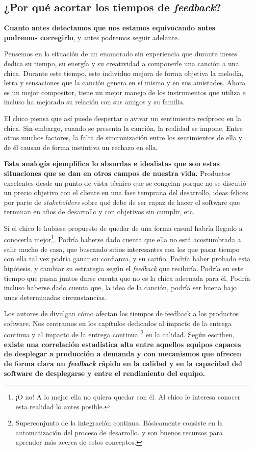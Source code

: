 \subsection{¿Por qué acortar los tiempos de \textit{feedback}?}

\textbf{Cuanto antes detectamos que nos estamos equivocando
antes podremos corregirlo}, y antes podremos seguir adelante.

Pensemos en la situación de un enamorado sin experiencia que durante meses dedica su
tiempo, su energía y su creatividad a componerle una canción a una chica.
Durante este tiempo, este individuo mejora de forma objetiva la
melodía, letra y sensaciones que la canción genera en sí mismo
y en sus amistades. Ahora es un mejor compositor, tiene un mejor manejo
de los instrumentos que utiliza e incluso ha mejorado su
relación con sus amigos y su familia.

El chico piensa que así puede despertar o avivar un sentimiento recíproco
en la chica. Sin embargo, cuando se presenta la canción,
la realidad se impone. Entre otros muchos factores,
la falta de sincronización entre los sentimientos de ella y de él causan
de forma instintiva un rechazo en ella.

\textbf{Esta analogía ejemplifica lo absurdas e idealistas
que son estas situaciones que se dan en otros campos de nuestra vida.}
Productos excelentes desde un punto de vista técnico que se
congelan porque no se discutió un precio objetivo con
el cliente en una fase temprana del desarrollo, ideas felices
por parte de \textit{stakeholders} sobre qué debe de
ser capaz de hacer el software que terminan en años de desarrollo
y con objetivos sin cumplir, etc.

Si el chico le hubiese propuesto de quedar de una forma casual
habría llegado a conocerla mejor\footnote{¡O no! A lo mejor ella no
quiera quedar con él. Al chico le interesa
conocer esta realidad lo antes posible.}. Podría haberse dado cuenta que
ella no está acostumbrada a salir mucho de casa, que buscando sitios
interesantes con los que pasar tiempo con ella tal vez podría ganar su
confianza, y su cariño. Podría haber probado esta hipótesis, y cambiar
su estrategia según el \textit{feedback} que recibiría. Podría en este tiempo que
pasan juntos darse cuenta que no es la chica adecuada para él. Podría
incluso haberse dado cuenta que, la idea de la canción, podría ser buena
bajo unas determinadas circunstancias.

Los autores de \cite{accelerate} divulgan cómo afectan los tiempos de feedback
a los productos software. Nos centramos en los capítulos dedicados al impacto de
la entrega continua y al impacto de la entrega continua%
\footnote{%
Superconjunto de la integración continua. Básicamente consiste en la automatización
del proceso de desarrollo. \cite{ModernSoftwareEngineering} y \cite{minimumViableCD}
son buenos recursos para aprender más acerca de estos conceptos.%
}%
en la calidad. Según escriben, \textbf{existe una correlación estadística alta entre aquellos
equipos capaces de desplegar a producción a demanda y 
con mecanismos que ofrecen de forma clara un \textit{feedback} rápido en
la calidad y en la capacidad del software de desplegarse y entre el rendimiento del
equipo.}

